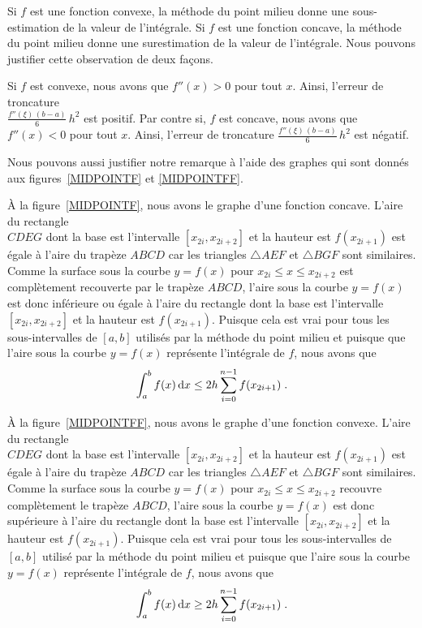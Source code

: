 {\begin{rmk}
Si $f$ est une fonction convexe, la méthode du point milieu donne une
sous-estimation de la valeur de l'intégrale.  Si $f$ est une fonction
concave, la méthode du point milieu donne une surestimation de la
valeur de l'intégrale.  Nous pouvons justifier cette observation de deux
façons.

Si $f$ est convexe, nous avons que $f''(x) >0$ pour tout $x$.  Ainsi,
l'erreur de troncature\\
$\displaystyle \frac{f''(\xi)\,(b-a)}{6}\,h^2$ est positif.
Par contre si, $f$ est concave, nous avons que $f''(x) <0$ pour tout
$x$.  Ainsi, l'erreur de troncature
$\displaystyle \frac{f''(\xi)\,(b-a)}{6}\,h^2$ est négatif.

Nous pouvons aussi justifier notre remarque à l'aide des graphes qui
sont donnés aux figures~\ref{MIDPOINTF} et \ref{MIDPOINTFF}.

À la figure~\ref{MIDPOINTF}, nous avons le graphe d'une fonction
concave.  L'aire du rectangle\\
\mbox{\rectangle$CDEG$} dont la base est
l'intervalle $[x_{2i},x_{2i+2}]$ et la hauteur est $f(x_{2i+1})$ est
égale à l'aire du trapèze \mbox{\trapeze$ABCD$} car les triangles
$\triangle AEF$ et $\triangle BGF$ sont similaires.  Comme la surface
sous la courbe $y=f(x)$ pour $x_{2i} \leq x \leq x_{2i+2}$ est
complètement recouverte par le trapèze \mbox{\trapeze$ABCD$}, l'aire
sous la courbe $y=f(x)$ est donc inférieure ou égale à l'aire du
rectangle dont la base est l'intervalle $[x_{2i},x_{2i+2}]$ et la
hauteur est $f(x_{2i+1})$.  Puisque cela est vrai pour tous les
sous-intervalles de $[a,b]$ utilisés par la méthode du point milieu et
puisque que l'aire sous la courbe $y=f(x)$ représente l'intégrale de
$f$, nous avons que
\[
\int_a^b f(x) \,\mathrm{d}x \leq 2h \sum_{i=0}^{n-1} f(x_{2i+1}) \; .
\]

À la figure~\ref{MIDPOINTFF}, nous avons le graphe d'une fonction
convexe.  L'aire du rectangle\\
\mbox{\rectangle$CDEG$} dont la base est
l'intervalle $[x_{2i},x_{2i+2}]$ et la hauteur est $f(x_{2i+1})$ est
égale à l'aire du trapèze \mbox{\trapeze$ABCD$} car les triangles
$\triangle AEF$ et $\triangle BGF$ sont similaires.  Comme la surface
sous la courbe $y=f(x)$ pour $x_{2i} \leq x \leq x_{2i+2}$ recouvre
complètement le trapèze \mbox{\trapeze$ABCD$}, l'aire sous la courbe
$y=f(x)$ est
donc supérieure à l'aire du rectangle dont la base est l'intervalle
$[x_{2i},x_{2i+2}]$ et la hauteur est $f(x_{2i+1})$.  Puisque cela est
vrai pour tous les sous-intervalles de $[a,b]$ utilisé par la méthode
du point milieu et puisque que l'aire sous la courbe $y=f(x)$
représente l'intégrale de $f$, nous avons que
\[
\int_a^b f(x) \,\mathrm{d}x \geq 2h \sum_{i=0}^{n-1} f(x_{2i+1}) \; .
\]
\end{rmk}

}
